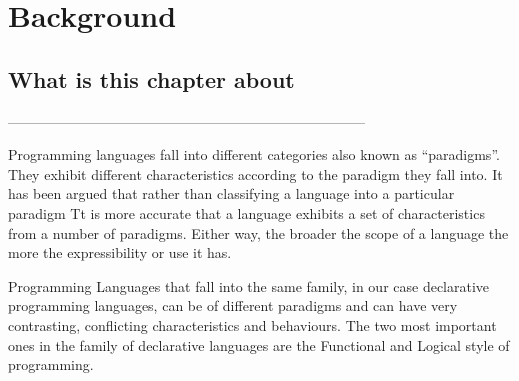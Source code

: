 \documentclass[thesis-solanki.tex]{subfiles}
\begin{document}
\chapter{Background}\label{chap:background}

\section{What is this chapter about}

-----------------------------------------------------------------------------

Programming languages fall into different categories also known as
``paradigms''. They exhibit different characteristics according to the paradigm they
fall into.
It has been argued \cite{Krishnamurthi:2008:TPL:1480828.1480846} that
rather than classifying a language into a particular paradigm
Tt is
more accurate that a language exhibits a set of characteristics from a
number of paradigms.
Either way, the broader the scope of a language the more the
expressibility or use it has.

Programming Languages that fall into the same family, in our case declarative programming languages, can be of
different paradigms and can have very contrasting, conflicting characteristics and behaviours. The two most
important ones in the family of declarative languages are the Functional and Logical style of programming.
\end{document}
